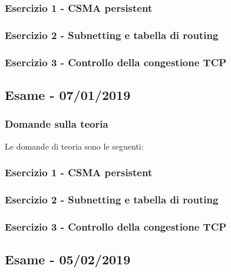\documentclass[a4paper]{article}
\begin{document}
	\subsubsection{Esercizio 1 - CSMA persistent}
	
	\subsubsection{Esercizio 2 - Subnetting e tabella di routing}
	
	\subsubsection{Esercizio 3 - Controllo della congestione TCP}

	\newpage

	\subsection[\textbf{Esame - 07/01/2019}]{Esame - 07/01/2019}

	\subsubsection{Domande sulla teoria}
	Le domande di teoria sono le seguenti:
	
	\subsubsection{Esercizio 1 - CSMA persistent}
	
	\subsubsection{Esercizio 2 - Subnetting e tabella di routing}
	
	\subsubsection{Esercizio 3 - Controllo della congestione TCP}

\newpage

	\subsection[\textbf{Esame - 05/02/2019}]{Esame - 05/02/2019}
	
\end{document}
